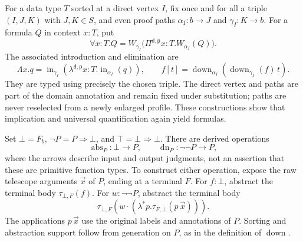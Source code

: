For a data type $T$ sorted at a direct vertex $I$, fix once and for all
a triple $(I,J,K)$ with $J,K\in S$, and even proof paths
$\alpha_I:b\to J$ and $\gamma_I:K\to b$.  For a formula $Q$ in
context $x:T$, put
\[
  \forall x:T.Q=
  W_{\gamma_I}\bigl(\Pi^{\mathsf d,\mathsf p}x:T.
                                       W_{\alpha_I}(Q)\bigr).
\]
The associated introduction and elimination are
\[
 \Lambda x.q=\operatorname{in}_{\gamma_I}
       (\lambda^{\mathsf d,\mathsf p}x:T.
                                  \operatorname{in}_{\alpha_I}(q)),
 \qquad
 f[t]=\operatorname{down}_{\alpha_I}
                   (\operatorname{down}_{\gamma_I}(f)\,t).
\]
They are typed using precisely the chosen triple.  The direct vertex and
paths are part of the domain annotation and remain fixed under
substitution; paths are never reselected from a newly enlarged profile.
These constructions show that implication and universal quantification
again yield formulas.

Set $\bot=F_b$, $\neg P=P\Rightarrow\bot$, and
$\top=\bot\Rightarrow\bot$.  There are derived operations
\[
        \operatorname{abs}_P:\bot\longrightarrow P,
        \qquad \operatorname{dn}_P:\neg\neg P\longrightarrow P,
\]
where the arrows describe input and output judgments, not an assertion that
these are primitive function types.  To construct either operation, expose
the raw telescope arguments $\vec x$ of $P$, ending at a terminal $F$.
For $f:\bot$, abstract the terminal body $\tau_{\bot,F}(f)$.
For $w:\neg\neg P$, abstract the terminal body
\[
 \tau_{\bot,F}\left(
       w\cdot(\lambda^*p.\tau_{F,\bot}(p\,\vec x))\right).
\]
The applications $p\,\vec x$ use the original labels and annotations
of $P$.  Sorting and abstraction support follow from generation on $P$,
as in the definition of $\operatorname{down}$.

